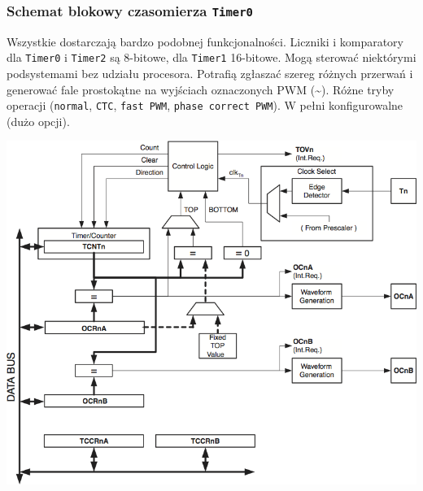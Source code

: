 \documentclass[8pt]{beamer}
\begin{document}
\begin{frame}
  \frametitle{Schemat blokowy czasomierza \texttt{Timer0}}

  Wszystkie dostarczają bardzo podobnej funkcjonalności. Liczniki i komparatory
  dla \texttt{Timer0} i \texttt{Timer2} są 8-bitowe, dla \texttt{Timer1}
  16-bitowe. Mogą sterować niektórymi podsystemami bez udziału procesora.
  Potrafią zgłaszać szereg różnych przerwań i generować fale prostokątne na
  wyjściach oznaczonych PWM (\textasciitilde). Różne tryby operacji
  (\texttt{normal}, \texttt{CTC}, \texttt{fast PWM}, \texttt{phase correct
    PWM}). W pełni konfigurowalne (dużo opcji).

  \begin{center}
    \includegraphics[scale=0.5]{images/timer.png}
  \end{center}
\end{frame}
\end{document}
